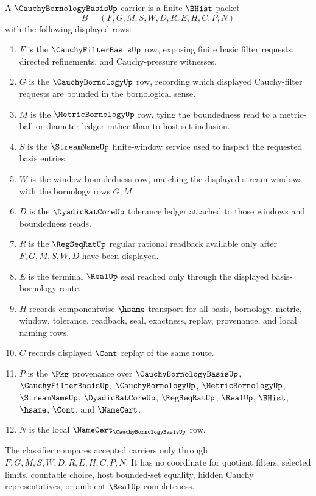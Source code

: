 \begin{definition}
\label{def:cauchy-bornology-basis-carrier}
A $\CauchyBornologyBasisUp$ carrier is a finite $\BHist$ packet
$$
B=(F,G,M,S,W,D,R,E,H,C,P,N)
$$
with the following displayed rows:
\begin{enumerate}
\item $F$ is the $\CauchyFilterBasisUp$ row, exposing finite basic filter requests, directed refinements, and Cauchy-pressure witnesses.
\item $G$ is the $\CauchyBornologyUp$ row, recording which displayed Cauchy-filter requests are bounded in the bornological sense.
\item $M$ is the $\MetricBornologyUp$ row, tying the boundedness read to a metric-ball or diameter ledger rather than to host-set inclusion.
\item $S$ is the $\StreamNameUp$ finite-window service used to inspect the requested basis entries.
\item $W$ is the window-boundedness row, matching the displayed stream windows with the bornology rows $G,M$.
\item $D$ is the $\DyadicRatCoreUp$ tolerance ledger attached to those windows and boundedness reads.
\item $R$ is the $\RegSeqRatUp$ regular rational readback available only after $F,G,M,S,W,D$ have been displayed.
\item $E$ is the terminal $\RealUp$ seal reached only through the displayed basis-bornology route.
\item $H$ records componentwise $\hsame$ transport for all basis, bornology, metric, window, tolerance, readback, seal, exactness, replay, provenance, and local naming rows.
\item $C$ records displayed $\Cont$ replay of the same route.
\item $P$ is the $\Pkg$ provenance over $\CauchyBornologyBasisUp$, $\CauchyFilterBasisUp$, $\CauchyBornologyUp$, $\MetricBornologyUp$, $\StreamNameUp$, $\DyadicRatCoreUp$, $\RegSeqRatUp$, $\RealUp$, $\BHist$, $\hsame$, $\Cont$, and $\NameCert$.
\item $N$ is the local $\NameCert_{\CauchyBornologyBasisUp}$ row.
\end{enumerate}
The classifier compares accepted carriers only through $F,G,M,S,W,D,R,E,H,C,P,N$. It has no coordinate for quotient filters, selected limits, countable choice, host bounded-set equality, hidden Cauchy representatives, or ambient $\RealUp$ completeness.
\end{definition}

